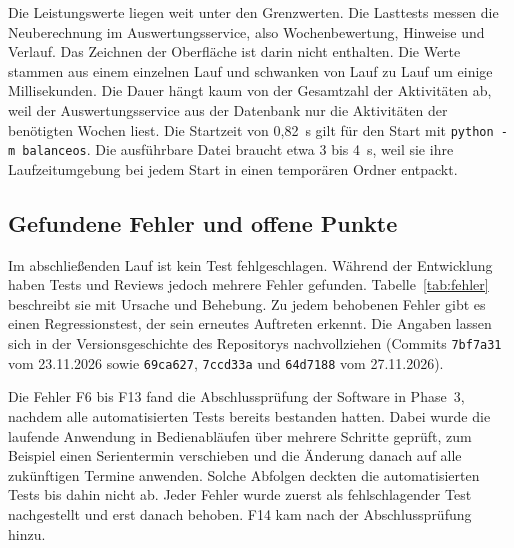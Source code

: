 Die Leistungswerte liegen weit unter den Grenzwerten. Die Lasttests messen die Neuberechnung im Auswertungsservice, also Wochenbewertung, Hinweise und Verlauf. Das Zeichnen der Oberfläche ist darin nicht enthalten. Die Werte stammen aus einem einzelnen Lauf und schwanken von Lauf zu Lauf um einige Millisekunden. Die Dauer hängt kaum von der Gesamtzahl der Aktivitäten ab, weil der Auswertungsservice aus der Datenbank nur die Aktivitäten der benötigten Wochen liest. Die Startzeit von 0,82~s gilt für den Start mit \texttt{python -m balanceos}. Die ausführbare Datei braucht etwa 3 bis 4~s, weil sie ihre Laufzeitumgebung bei jedem Start in einen temporären Ordner entpackt.

\subsection{Gefundene Fehler und offene Punkte}\label{sec:fehler}
Im abschließenden Lauf ist kein Test fehlgeschlagen. Während der Entwicklung haben Tests und Reviews jedoch mehrere Fehler gefunden. Tabelle~\ref{tab:fehler} beschreibt sie mit Ursache und Behebung. Zu jedem behobenen Fehler gibt es einen Regressionstest, der sein erneutes Auftreten erkennt. Die Angaben lassen sich in der Versionsgeschichte des Repositorys nachvollziehen (Commits \texttt{7bf7a31} vom 23.11.2026 sowie \texttt{69ca627}, \texttt{7ccd33a} und \texttt{64d7188} vom 27.11.2026).

Die Fehler F6 bis F13 fand die Abschlussprüfung der Software in Phase~3, nachdem alle automatisierten Tests bereits bestanden hatten. Dabei wurde die laufende Anwendung in Bedienabläufen über mehrere Schritte geprüft, zum Beispiel einen Serientermin verschieben und die Änderung danach auf alle zukünftigen Termine anwenden. Solche Abfolgen deckten die automatisierten Tests bis dahin nicht ab. Jeder Fehler wurde zuerst als fehlschlagender Test nachgestellt und erst danach behoben. F14 kam nach der Abschlussprüfung hinzu.

